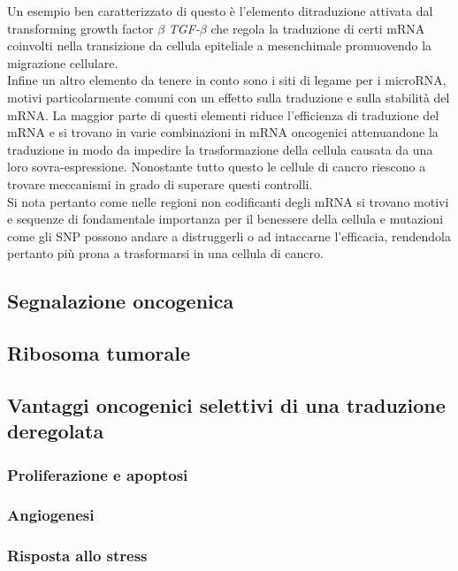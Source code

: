 	Un esempio ben caratterizzato di questo \`e l'elemento ditraduzione attivata dal transforming growth factor $\beta$ \emph{TGF-$\beta$} che regola la traduzione di certi mRNA coinvolti nella transizione da cellula epiteliale a mesenchimale promuovendo la migrazione cellulare.\\
	Infine un altro elemento da tenere in conto sono i siti di legame per i microRNA, motivi particolarmente comuni con un effetto sulla traduzione e sulla stabilit\`a del mRNA.
	La maggior parte di questi elementi riduce l'efficienza di traduzione del mRNA e si trovano in varie combinazioni in mRNA oncogenici attenuandone la traduzione in modo da impedire la trasformazione della cellula causata da una loro sovra-espressione.
	Nonostante tutto questo le cellule di cancro riescono a trovare meccanismi in grado di superare questi controlli.\\
	Si nota pertanto come nelle regioni non codificanti degli mRNA si trovano motivi e sequenze di fondamentale importanza per il benessere della cellula e mutazioni come gli SNP possono andare a distruggerli o ad intaccarne l'efficacia, rendendola pertanto pi\`u prona a trasformarsi in una cellula di cancro.

	\subsection{Segnalazione oncogenica}

	\subsection{Ribosoma tumorale}

	\subsection{Vantaggi oncogenici selettivi di una traduzione deregolata}

	\subsubsection{Proliferazione e apoptosi}

	\subsubsection{Angiogenesi}

	\subsubsection{Risposta allo stress}

